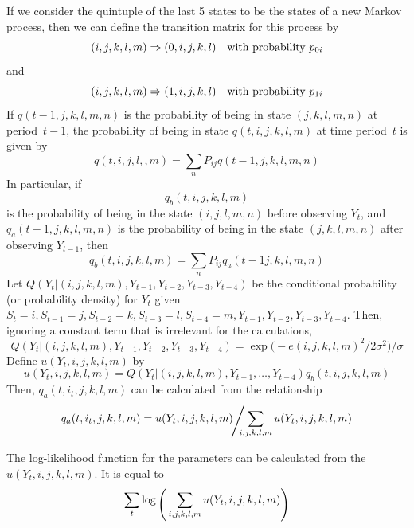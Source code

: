 \documentclass{admbmanual}
\begin{document}
If we consider the quintuple of the last 5 states to be 
the states of a new Markov process, then we can define the transition matrix
for this process by
$$(i,j,k,l,m) \Rightarrow (0,i,j,k,l) 
 \hbox{\rm \quad with probability\ } p_{0i}$$
and
$$(i,j,k,l,m) \Rightarrow (1,i,j,k,l) 
 \hbox{\rm \quad with probability\ } p_{1i}$$
 If $q(t-1,j,k,l,m,n)$ is the probability of
being in state $(j,k,l,m,n)$  at period~$t-1$,
the probability of being in state $q(t,i,j,k,l,m)$ 
at time period~$t$ is given by
$$q(t,i,j,l,,m)=\sum_{n}
  P_{ij}q(t-1,j,k,l,m,n)$$
In particular, if $$q_b(t,i,j,k,l,m)$$ is the 
probability of being in
the state $(i,j,l,m,n)$ before observing $Y_t$,
and 
\hbox{$q_a(t-1,j,k,l,m,n)$} is the probability of being in
the state $(j,k,l,m,n)$ after observing 
$Y_{t-1}$, then
\begin{equation}
 {
q_b(t,i,j,k,l,m)=\sum_{n}
  P_{ij}q_a(t-1j,k,l,m,n)}
\label{chp4:xx3}
\end{equation} 
Let $Q(Y_t|(i,j,k,l,m),Y_{t-1},Y_{t-2},Y_{t-3},Y_{t-4})$ 
be the conditional probability (or probability density) for
$Y_t$ given $S_{t}=i,S_{t-1}=j,S_{t-2}=k,S_{t-3}=l,S_{t-4}=m,
Y_{t-1},Y_{t-2},Y_{t-3},Y_{t-4}$. Then, ignoring a constant term
that is irrelevant for the calculations,
\begin{equation}
{
Q(Y_t|(i,j,k,l,m),Y_{t-1},Y_{t-2},Y_{t-3},Y_{t-4})=
  \exp\big({}-e(i,j,k,l,m)^2/2\sigma^2\big)/\sigma }
\label{chp4:xx4}
\end{equation} 
Define $u(Y_t,i,j,k,l,m)$ by
\begin{equation}
 u(Y_t,i,j,k,l,m)=
{
  Q(Y_t|(i,j,k,l,m),Y_{t-1},\ldots,Y_{t-4})
    q_b(t,i,j,k,l,m)}
\label{chp4:xx5}
\end{equation} 
Then, $q_a(t,i_{t},j,k,l,m)$ can be calculated 
from the relationship
\begin{equation}
{
q_a(t,i_{t},j,k,l,m)= u(Y_t,i,j,k,l,m)\kern-.2em \raisebox{-.2em}{\Bigg/}\kern-.7em
   \sum_{i,j,k,l,m} u(Y_t,i,j,k,l,m)} 
\label{chp4:xx6}
\end{equation} 

The log-likelihood function for the parameters can be calculated
from the $u(Y_t,i,j,k,l,m)$. It is equal to
\begin{equation}
{
\sum_t \log\raisebox{-.4em}{\Bigg(}\sum_{i,j,k,l,m} 
        u(Y_t,i,j,k,l,m)\raisebox{-.4em}{\Bigg)} }
\label{chp4:xx7}
\end{equation} 
\end{document}
